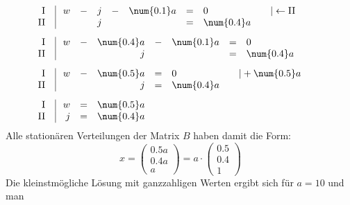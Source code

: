\begin{exercise}
\begin{enumerate}[a)]
\begin{alignat*}{1}
                \\[1ex] &
                \begin{array}{r|rcrcrcll}
                 \text{I}\;\;&\; w & - & j & - & \num{0.1}a & = & 0          & \quad|\leftarrow\text{II} \\
                \text{II}\;\;&\;   &   & j &   &            & = & \num{0.4}a & \quad\relax
                \end{array}
                \\[1ex] &
                \begin{array}{r|rcrcrcll}
                 \text{I}\;\;&\; w & - & \num{0.4}a & - & \num{0.1}a & = & 0          & \quad\relax \\
                \text{II}\;\;&\;   &   &          j &   &            & = & \num{0.4}a & \quad\relax
                \end{array}
                \\[1ex] &
                \begin{array}{r|rcrcll}
                 \text{I}\;\;&\; w & - & \num{0.5}a & = & 0          & \quad|+\num{0.5}a \\
                \text{II}\;\;&\;   &   &          j & = & \num{0.4}a & \quad\relax
                \end{array}
                \\[1ex] &
                \begin{array}{r|rcl}
                 \text{I}\;\;&\; w & = & \num{0.5}a \\
                \text{II}\;\;&\; j & = & \num{0.4}a
                \end{array}
              \end{alignat*}
            \endgroup
            Alle stationären Verteilungen der Matrix
            $B$ haben damit die Form:
            \begin{equation*}
              x=\begin{pmatrix}\num{0.5}a\\\num{0.4}a\\a\end{pmatrix}
               =a\cdot\begin{pmatrix}\num{0.5}\\\num{0.4}\\\num{1}\end{pmatrix}
            \end{equation*}
            Die kleinstmögliche Lösung mit
            ganzzahligen Werten ergibt sich
            für $a=\num{10}$ und man

\end{enumerate}
\end{exercise}
